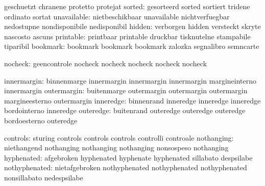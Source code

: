                           geschuetzt                chranene
                           protetto                  protejat
                   sorted: gesorteerd                sorted
                           sortiert                  tridene
                           ordinato                  sortat
              unavailable: nietbeschikbaar           unavailable
                           nichtverfuegbar           nedostupne
                           nondisponibile            nedisponibil
                   hidden: verborgen                 hidden
                           versteckt                 skryte
                           nascosto                  ascuns
                printable: printbaar                 printable
                           druckbar                  tisknutelne
                           stampabile                tiparibil
                 bookmark: bookmark                  bookmark
                           bookmark                  zalozka
                           segnalibro                semncarte

     nocheck: geencontrole  nocheck
              nocheck       nocheck
              nocheck       nocheck


              innermargin: binnenmarge               innermargin
                           innermargin               innermargin
                           margineinterno            innermargin
              outermargin: buitenmarge               outermargin
                           outermargin               outermargin
                           margineesterno            outermargin
                inneredge: binnenrand                inneredge
                           inneredge                 inneredge
                           bordointerno              inneredge
                outeredge: buitenrand                outeredge
                           outeredge                 outeredge
                           bordoesterno              outeredge

                 controls: sturing                   controls
                           controls                  controls
                           controlli                 controale
               nothanging: niethangend               nothanging
                           nothanging                nothanging
                           nonsospeso                nothanging
               hyphenated: afgebroken                hyphenated
                           hyphenate                 hyphenated
                           sillabato                 despsilabe
            nothyphenated: nietafgebroken            nothyphenated
                           nothyphenated             nothyphenated
                           nonsillabato              nedespsilabe

